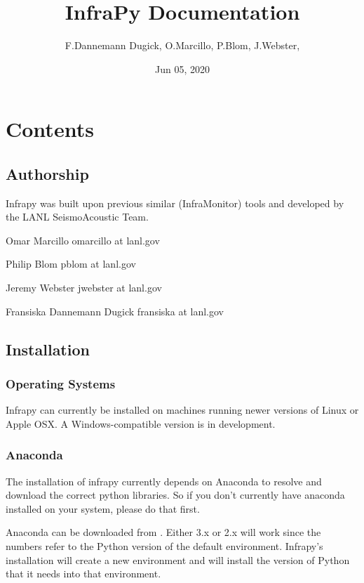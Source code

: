 \documentclass[letterpaper,10pt,english]{sphinxmanual}
\title{InfraPy Documentation}
\date{Jun 05, 2020}
\author{F.Dannemann Dugick, O.Marcillo, P.Blom, J.Webster, }
\begin{document}
\pagestyle{empty}
\sphinxmaketitle
\pagestyle{plain}
\sphinxtableofcontents
\pagestyle{normal}
\label{\detokenize{index::doc}}



\chapter{Contents}
\label{\detokenize{index:contents}}

\section{Authorship}
\label{\detokenize{authorship:authorship}}\label{\detokenize{authorship::doc}}
Infrapy was built upon previous similar (InfraMonitor) tools and developed by the LANL SeismoAcoustic Team.

Omar Marcillo
omarcillo at lanl.gov

Philip Blom
pblom at lanl.gov

Jeremy Webster
jwebster at lanl.gov

Fransiska Dannemann Dugick
fransiska at lanl.gov


\section{Installation}
\label{\detokenize{installation:installation}}\label{\detokenize{installation:id1}}\label{\detokenize{installation::doc}}

\subsection{Operating Systems}
\label{\detokenize{installation:operating-systems}}
Infrapy can currently be installed on machines running newer versions of Linux or Apple OSX.  A Windows-compatible version is in development.


\subsection{Anaconda}
\label{\detokenize{installation:anaconda}}
The installation of infrapy currently depends on Anaconda to resolve and download the correct python libraries. So if you don’t currently have anaconda installed
on your system, please do that first.

Anaconda can be downloaded from . Either 3.x or 2.x will work since the numbers refer to the Python version of the default
environment.  Infrapy’s installation will create a new environment and will install the version of Python that it needs into that environment.
\end{document}
